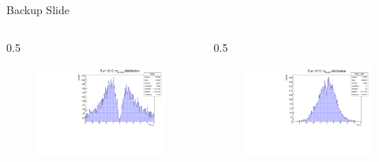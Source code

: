 \documentclass{beamer}[10pt]
\begin{document}
\begin{frame}{Backup Slide}
\begin{columns}
\begin{column}{0.5\framewidth}
  \begin{figure}[H]
    \centering
    \includegraphics[width= \textwidth]{figures/pdf/mxy.pdf}
    \label{fig:enter-label}
\end{figure}
\end{column}
\begin{column}{0.5\framewidth}
  \begin{figure}[H]
    \centering
    \includegraphics[width= \textwidth]{figures/pdf/myz_rec.pdf}
    \label{fig:enter-label}
\end{figure}
\vspace{-12mm}


\end{column}
\end{columns}
\end{frame}
\end{document}
